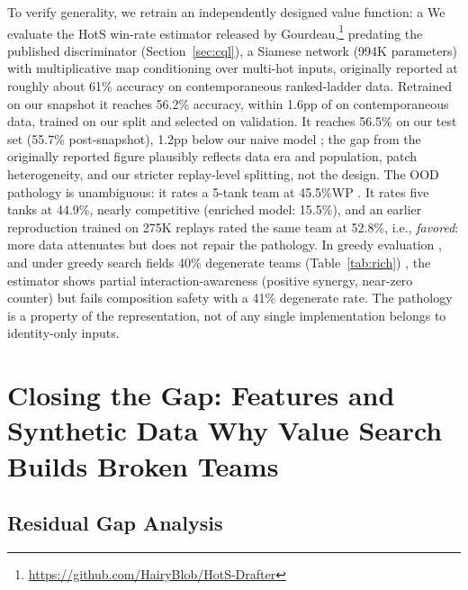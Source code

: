 \documentclass[journal]{IEEEtran}
\providecommand{\DIFaddtex}[1]{{\protect\color{blue} \sf #1}} %
\providecommand{\DIFdeltex}[1]{{\protect\color{red} \scriptsize #1}} %
\providecommand{\DIFaddbegin}{} %
\providecommand{\DIFaddend}{} %
\providecommand{\DIFdelbegin}{} %
\providecommand{\DIFdelend}{} %
\providecommand{\DIFadd}[1]{\texorpdfstring{\DIFaddtex{#1}}{#1}} %
\providecommand{\DIFdel}[1]{\texorpdfstring{\DIFdeltex{#1}}{}} %
\begin{document}
\DIFdel{To verify generality, we retrain an independently designed value function: a }\DIFdelend \DIFaddbegin \DIFadd{We evaluate the }\DIFaddend HotS win-rate estimator released by Gourdeau,\footnote{\url{https://github.com/HairyBlob/HotS-Drafter}} \DIFdelbegin \DIFdel{predating the published discriminator (Section~\ref{sec:cql}), }\DIFdelend a Siamese network (994K parameters) with multiplicative map conditioning over multi-hot inputs, originally reported at \DIFdelbegin \DIFdel{roughly }\DIFdelend \DIFaddbegin \DIFadd{about }\DIFaddend 61\% \DIFdelbegin \DIFdel{accuracy on contemporaneous ranked-ladder data. Retrained on our snapshot it reaches 56.2\% accuracy, within 1.6pp of }\DIFdelend \DIFaddbegin \DIFadd{on contemporaneous data, trained on our split and selected on validation. It reaches 56.5\% on our test set (55.7\% post-snapshot), 1.2pp below }\DIFaddend our naive model\DIFdelbegin \DIFdel{; the gap from the originally reported figure plausibly reflects data era and population, patch heterogeneity, and our stricter replay-level splitting, not the design. The OOD pathology is unambiguous: it rates a 5-tank team at 45.5\%WP}\DIFdelend \DIFaddbegin \DIFadd{. It rates five tanks at 44.9\%}\DIFaddend , nearly competitive\DIFdelbegin \DIFdel{(enriched model: 15.5\%), and an earlier reproduction trained on 275K replays rated the same team at 52.8\%, i.e., \textit{favored}: more data attenuates but does not repair the pathology. In greedy evaluation }\DIFdelend \DIFaddbegin \DIFadd{, and under greedy search fields 40\% degenerate teams }\DIFaddend (Table~\ref{tab:rich})\DIFdelbegin \DIFdel{, the estimator shows partial interaction-awareness (positive synergy, near-zero counter) but fails composition safety with a 41\% degenerate rate}\DIFdelend . The pathology \DIFdelbegin \DIFdel{is a property of the representation, not of any single implementation}\DIFdelend \DIFaddbegin \DIFadd{belongs to identity-only inputs}\DIFaddend .

\section{\DIFdelbegin \DIFdel{Closing the Gap: Features and Synthetic Data}\DIFdelend \DIFaddbegin \DIFadd{Why Value Search Builds Broken Teams}\DIFaddend }
\DIFdelbegin %
\DIFdelend \DIFaddbegin \label{sec:synth}
\DIFaddend 

\DIFdelbegin \subsection{\DIFdel{Residual Gap Analysis}}
\addtocounter{subsection}{-1}%
\end{document}
